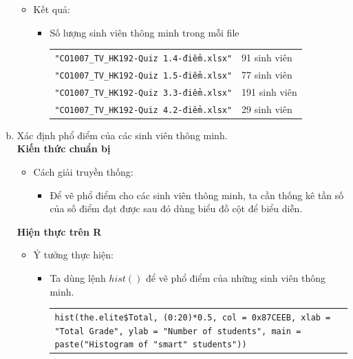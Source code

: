 \documentclass[a4paper]{article}
\theoremstyle{definition}
\begin{document}
\begin{enumerate}[a)]
\begin{itemize}
\begin{itemize}
        \end{itemize}
        \item Kết quả:
        \begin{itemize}
            \item Số lượng sinh viên thông minh trong mỗi file
            \begin{center}
                \begin{tabular}{l l}
                     \texttt{"CO1007\_TV\_HK192-Quiz 1.4-điểm.xlsx"} & 91 sinh viên\\ 
                     \texttt{"CO1007\_TV\_HK192-Quiz 1.5-điểm.xlsx"} & 77 sinh viên\\ 
                     \texttt{"CO1007\_TV\_HK192-Quiz 3.3-điểm.xlsx"} & 191 sinh viên\\ 
                     \texttt{"CO1007\_TV\_HK192-Quiz 4.2-điểm.xlsx"} & 29 sinh viên\\ 
                \end{tabular}
            \end{center}
        \end{itemize}
    \end{itemize}
    \bf\item {Xác định phổ điểm của các sinh viên thông minh.}\\[6pt]
    \bf Kiến thức chuẩn bị\normalfont
    \begin{itemize}
        \item Cách giải truyền thống:
        \begin{itemize}
            \item Để vẽ phổ điểm cho các sinh viên thông minh, ta cần thống kê tần số của số điểm đạt được sau đó dùng biểu đồ cột để biểu diễn.
        \end{itemize}
    \end{itemize}
    \bf Hiện thực trên R\normalfont
    \begin{itemize}
        \item Ý tưởng thực hiện:
        \begin{itemize}
            \item Ta dùng lệnh $hist()$ để vẽ phổ điểm của những sinh viên thông minh.
            \begin{center}
                \begin{tabular}{p{13cm}}
                    \texttt{hist(the.elite\$Total, (0:20)*0.5, col = 0x87CEEB, xlab = "Total Grade", ylab = "Number of students", main = paste("Histogram of "smart" students"))}
                \end{tabular}

\end{center}
\end{itemize}
\end{itemize}
\end{enumerate}
\end{document}
